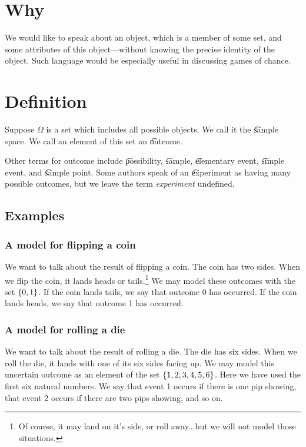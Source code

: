 
\section*{Why}

We would like to speak about an object, which is a member of some set, and some attributes of this object---without knowing the precise identity of the object.
Such language would be especially useful in discussing games of chance.

\section*{Definition}

Suppose $\Omega $ is a set which includes all possible objects.
We call it the \t{sample space}.
We call an element of this set an \t{outcome}.

Other terms for outcome include \t{possibility}, \t{sample}, \t{elementary event}, \t{simple event}, and \t{sample point}.
Some authors speak of an \t{experiment} as having many possible outcomes, but we leave the term \textit{experiment} undefined.

\subsection*{Examples}

\subsubsection*{A model for flipping a coin}



We want to talk about the result of flipping a coin.
The coin has two sides.
When we flip the coin, it lands heads or tails.\footnote{Of course, it may land on it's side, or roll away...but we will not model those situations.}
We may model these outcomes with the set $\{0, 1\}$.
If the coin lands tails, we say that outcome 0 has occurred.
If the coin lands heads, we say that outcome 1 has occurred.

\subsubsection*{A model for rolling a die}



We want to talk about the result of rolling a die.
The die has six sides.
When we roll the die, it lands with one of its six sides facing up.
We may model this uncertain outcome as an element of the set $\{1, 2, 3, 4, 5, 6\}$.
Here we have used the first six natural numbers.
We say that event 1 occurs if there is one pip showing, that event 2 occurs if there are two pips showing, and so on.

